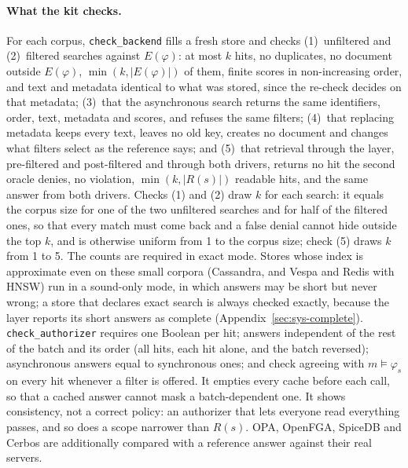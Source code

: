 \paragraph{What the kit checks.}
For each corpus, \texttt{check\_backend} fills a fresh store and checks (1)~unfiltered and
(2)~filtered searches against $E(\varphi)$: at most $k$ hits, no duplicates, no document outside
$E(\varphi)$, $\min(k,|E(\varphi)|)$ of them, finite scores in non-increasing order, and text and
metadata identical to what was stored, since the re-check decides on that metadata; (3)~that the
asynchronous search returns the same identifiers, order, text, metadata and scores, and refuses the
same filters; (4)~that replacing metadata keeps every text, leaves no old key, creates no document
and changes what filters select as the reference says; and (5)~that retrieval through the layer,
pre-filtered and post-filtered and through both drivers, returns no hit the second oracle denies, no
violation, $\min(k,|R(s)|)$ readable hits, and the same answer from both drivers. Checks (1) and (2)
draw $k$ for each search: it equals the corpus size for one of the two unfiltered searches and for
half of the filtered ones, so that every match must come back and a false denial cannot hide outside
the top $k$, and is otherwise uniform from 1 to the corpus size; check (5) draws $k$ from 1 to 5. The
counts are
required in exact mode. Stores whose index is approximate even on these small corpora (Cassandra, and
Vespa and Redis with HNSW) run in a sound-only mode, in which answers may be short but never wrong; a
store that declares exact search is always checked exactly, because the layer reports its short
answers as complete (Appendix~\ref{sec:sys-complete}). \texttt{check\_authorizer} requires one Boolean
per hit; answers independent of the rest of the batch and its order (all hits, each hit alone, and
the batch reversed); asynchronous answers equal to synchronous ones; and $\mathrm{check}$ agreeing with
$m \models \varphi_s$ on every hit whenever a filter is offered. It empties every cache before each
call, so that a cached answer cannot mask a batch-dependent one. It shows consistency, not a correct
policy: an authorizer that lets everyone read everything passes, and so does a scope narrower than
$R(s)$. OPA, OpenFGA, SpiceDB and Cerbos are additionally compared with a reference answer against
their real servers.

